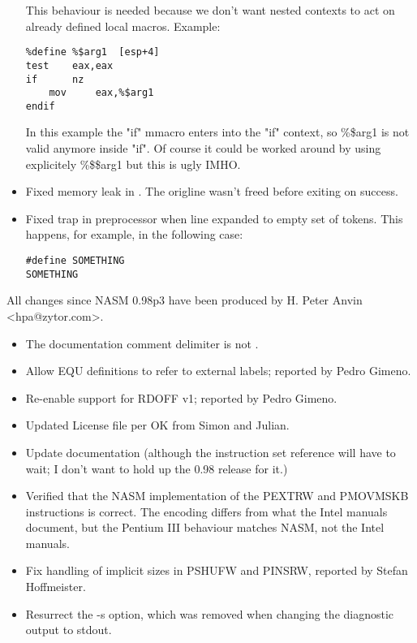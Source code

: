 \begin{itemize}
{        This behaviour is needed because we don't want nested contexts to
        act on already defined local macros. Example:
\begin{lstlisting}
%define %$arg1  [esp+4]
test    eax,eax
if      nz
    mov     eax,%$arg1
endif
\end{lstlisting}
        In this example the "if" mmacro enters into the "if" context, so \%\$arg1
        is not valid anymore inside "if". Of course it could be worked around
        by using explicitely \%\$\$arg1 but this is ugly IMHO.}
    \item{Fixed memory leak in . The origline wasn't freed before exiting on success.}
    \item{Fixed trap in preprocessor when line expanded to empty set of tokens.
        This happens, for example, in the following case:
\begin{lstlisting}
#define SOMETHING
SOMETHING
\end{lstlisting}}
\end{itemize}


All changes since NASM 0.98p3 have been produced by H. Peter Anvin <hpa@zytor.com>.

\begin{itemize}
    \item{The documentation comment delimiter is \code{\textbackslash \#}
        not \code{\#}.}
    \item{Allow EQU definitions to refer to external labels; reported by Pedro Gimeno.}
    \item{Re-enable support for RDOFF v1; reported by Pedro Gimeno.}
    \item{Updated License file per OK from Simon and Julian.}
\end{itemize}


\begin{itemize}
    \item{Update documentation (although the instruction set reference will
        have to wait; I don't want to hold up the 0.98 release for it.)}
    \item{Verified that the NASM implementation of the PEXTRW and PMOVMSKB
        instructions is correct. The encoding differs from what the Intel
        manuals document, but the Pentium III behaviour matches NASM, not
        the Intel manuals.}
    \item{Fix handling of implicit sizes in PSHUFW and PINSRW, reported by
        Stefan Hoffmeister.}
    \item{Resurrect the -s option, which was removed when changing the
        diagnostic output to stdout.}
\end{itemize}

